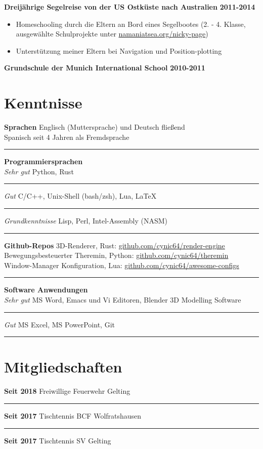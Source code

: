 \documentclass[12pt]{article}
\newcommand{\link}[1]{{\color{blue}\underline{#1}}}
\newcommand{\sect}[1]{
  {
    \vspace{12pt}
    \section*{
      \fontsize{18}{0}\selectfont
      \hspace{-12pt}
      \vspace{-12pt}
      #1
    }
    \vspace{-6pt}
  }
}
\newcommand{\sep}{{\color{gray}\vspace{-12pt}\hrule}}
\begin{document}
\textbf{Dreij{\"a}hrige Segelreise von der US Ostk{\"u}ste nach Australien} \hfill{\textbf{2011-2014}}

\vspace{-18pt}
\begin{itemize}[leftmargin=*]
  \itemsep3pt

\item Homeschooling durch die Eltern an Bord eines Segelbootes (2. - 4. Klasse,
  ausgew{\"a}hlte Schulprojekte unter \link{namaniatsea.org/nicky-page})

\item Unterst{\"u}tzung meiner Eltern bei Navigation und Position-plotting

\end{itemize}
\vspace{-6pt}

\textbf{Grundschule der Munich International School} \hfill{\textbf{2010-2011}}

\pagebreak

\sect{Kenntnisse}
\textbf{Sprachen} \hfill{Englisch (Muttersprache) und Deutsch flie{\ss}end} \\
\hspace*{\fill}Spanisch seit 4 Jahren als Fremdsprache \\
\sep
\vspace{12pt}

\textbf{Programmiersprachen} \\
\textit{Sehr gut} \hfill{Python, Rust} \\
\sep
\textit{Gut} \hfill{C/C++, Unix-Shell (bash/zsh), Lua, \LaTeX} \\
\sep
\textit{Grundkenntnisse} \hfill{Lisp, Perl, Intel-Assembly (NASM)} \\
\sep
\vspace{12pt}

{
  \small
  \textbf{Github-Repos} \hfill{3D-Renderer, Rust: \link{github.com/cynic64/render-engine}} \\
  \hspace*{\fill} Bewegungsbesteuerter Theremin, Python: \link{github.com/cynic64/theremin} \\
  \hspace*{\fill} Window-Manager Konfiguration, Lua:
  \link{github.com/cynic64/awesome-configs} \\
}
\sep
\vspace{12pt}

\textbf{Software Anwendungen} \\
\textit{Sehr gut} \hfill{MS Word, Emacs und Vi Editoren, Blender 3D Modelling Software} \\
\sep
\textit{Gut} \hfill{MS Excel, MS PowerPoint, Git} \\
\sep
\vspace{12pt}

\sect{Mitgliedschaften}

\textbf{Seit 2018} \hfill{Freiwillige Feuerwehr Gelting} \\
\sep
\textbf{Seit 2017} \hfill{Tischtennis BCF Wolfratshausen} \\
\sep
\textbf{Seit 2017} \hfill{Tischtennis SV Gelting}
\end{document}
